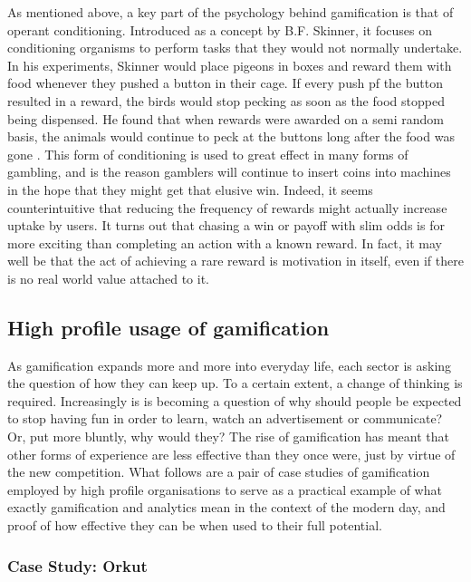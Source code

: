 \documentclass{article}
\begin{document}
As mentioned above, a key part of the psychology behind gamification is that of operant conditioning. Introduced as a concept by B.F. Skinner, it focuses on conditioning organisms to perform tasks that they would not normally undertake. In his experiments, Skinner would place pigeons in boxes and reward them with food whenever they pushed a button in their cage. If every push pf the button resulted in a reward, the birds would stop pecking as soon as the food stopped being dispensed. He found that when rewards were awarded on a semi random basis, the animals would continue to peck at the buttons long after the food was gone \cite{kapp2012gamification}. This form of conditioning is used to great effect in many forms of gambling, and is the reason gamblers will continue to insert coins into machines in the hope that they might get that elusive win. Indeed, it seems counterintuitive that reducing the frequency of rewards might actually increase uptake by users. It turns out that chasing a win or payoff with slim odds is for more exciting than completing an action with a known reward. In fact, it may well be that the act of achieving a rare reward is motivation in itself, even if there is no real world value attached to it.

\subsection{High profile usage of gamification}
As gamification expands more and more into everyday life, each sector is asking the question of how they can keep up. To a certain extent, a change of thinking is required. Increasingly is is becoming a question of why should people be expected to stop having fun in order to learn, watch an advertisement or communicate? \cite{zichermann2010game} Or, put more bluntly, why would they? The rise of gamification has meant that other forms of experience are less effective than they once were, just by virtue of the new competition. What follows are a pair of case studies of gamification employed by high profile organisations to serve as a practical example of what exactly gamification and analytics mean in the context of the modern day, and proof of how effective they can be when used to their full potential.

\subsubsection{Case Study: Orkut}
\end{document}
